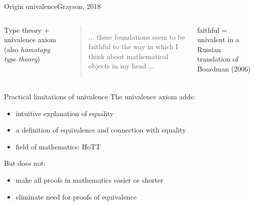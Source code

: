 \documentclass[english]{beamer}
\begin{document}
\begin{frame}{Origin univalence}{Grayson, 2018}
\begin{columns}[c]
    \begin{definition}
     Type theory + univalence axiom (also \emph{homotopy type theory})
    \end{definition}


        \pause

        \begin{quotation}
        ... these foundations seem to be faithful to the way in which I think about mathematical objects in my head ...
        \end{quotation}

        faithful = univalent in a Russian translation of Boardman (2006)

\end{columns}
\end{frame}

\begin{frame}{Practical limitations of univalence}
The univalence axiom adds:
\begin{itemize}
    \item intuitive explanation of equality
    \item a definition of equivalence and connection with equality
    \item field of mathematics: HoTT
\end{itemize}

But does not:
\begin{itemize}
    \item make all proofs in mathematics easier or shorter
    \item eliminate need for proofs of equivalence
\end{itemize}




\end{frame}
\end{document}
